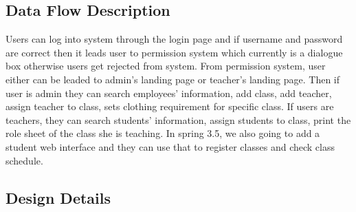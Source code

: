 \subsection{Data Flow Description}
 Users can log into system through the login page and if username and password are correct then it leads user to permission system which currently is a dialogue box otherwise users get rejected from system. From permission system, user either can be leaded to admin's landing page or teacher's landing page. Then if user is admin they can search employees’ information, add class, add teacher, assign teacher to class, sets clothing requirement for specific class. If users are teachers, they can search students’ information, assign students to class, print the role sheet of the class she is teaching.
In spring 3.5, we also going to add a student web interface and they can use that to register classes and check class schedule. 

\subsection{Design Details}
